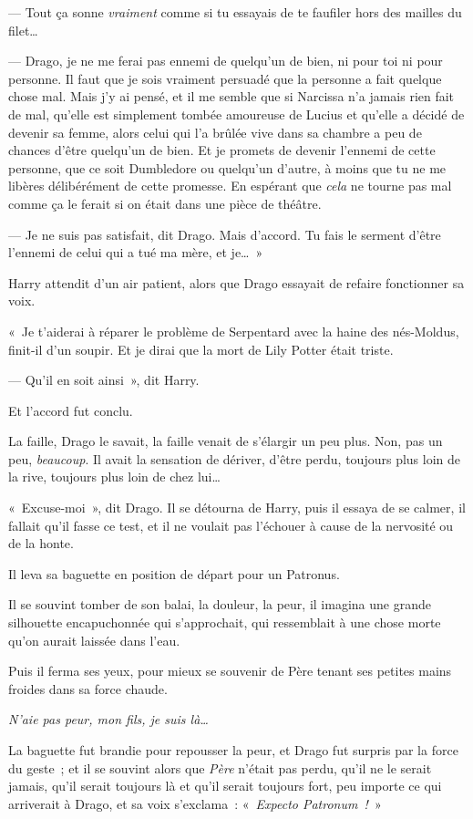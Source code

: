 --- Tout ça sonne \emph{vraiment} comme si tu essayais de te faufiler hors des mailles du filet…

--- Drago, je ne me ferai pas ennemi de quelqu'un de bien, ni pour toi ni pour personne.
Il faut que je sois vraiment persuadé que la personne a fait quelque chose mal.
Mais j'y ai pensé, et il me semble que si Narcissa n'a jamais rien fait de mal, qu'elle est simplement tombée amoureuse de Lucius et qu'elle a décidé de devenir sa femme, alors celui qui l'a brûlée vive dans sa chambre a peu de chances d'être quelqu'un de bien.
Et je promets de devenir l'ennemi de cette personne, que ce soit Dumbledore ou quelqu'un d'autre, à moins que tu ne me libères délibérément de cette promesse.
En espérant que \emph{cela} ne tourne pas mal comme ça le ferait si on était dans une pièce de théâtre.

--- Je ne suis pas satisfait, dit Drago.
Mais d'accord.
Tu fais le serment d'être l'ennemi de celui qui a tué ma mère, et je…~»

Harry attendit d'un air patient, alors que Drago essayait de refaire fonctionner sa voix.

«~Je t'aiderai à réparer le problème de Serpentard avec la haine des nés-Moldus, finit-il d'un soupir.
Et je dirai que la mort de Lily Potter était triste.

--- Qu'il en soit ainsi~», dit Harry.

Et l'accord fut conclu.

La faille, Drago le savait, la faille venait de s'élargir un peu plus.
Non, pas un peu, \emph{beaucoup}.
Il avait la sensation de dériver, d'être perdu, toujours plus loin de la rive, toujours plus loin de chez lui…

«~Excuse-moi~», dit Drago.
Il se détourna de Harry, puis il essaya de se calmer, il fallait qu'il fasse ce test, et il ne voulait pas l'échouer à cause de la nervosité ou de la honte.

Il leva sa baguette en position de départ pour un Patronus.

Il se souvint tomber de son balai, la douleur, la peur, il imagina une grande silhouette encapuchonnée qui s'approchait, qui ressemblait à une chose morte qu'on aurait laissée dans l'eau.

Puis il ferma ses yeux, pour mieux se souvenir de Père tenant ses petites mains froides dans sa force chaude.

\emph{N'aie pas peur, mon fils, je suis là…}

La baguette fut brandie pour repousser la peur, et Drago fut surpris par la force du geste~; et il se souvint alors que \emph{Père} n'était pas perdu, qu'il ne le serait jamais, qu'il serait toujours là et qu'il serait toujours fort, peu importe ce qui arriverait à Drago, et sa voix s'exclama~: «~\emph{Expecto Patronum~!}~»


